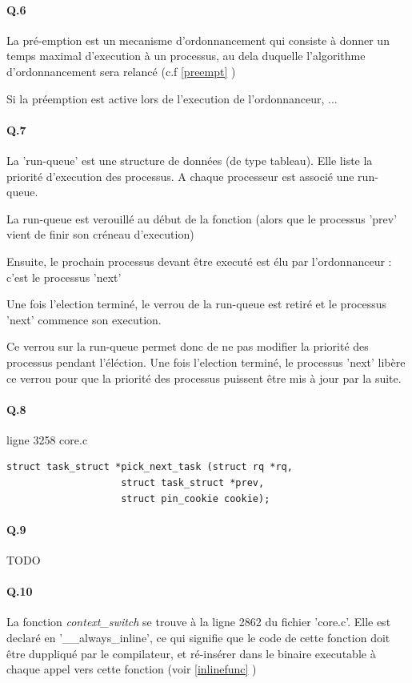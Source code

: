 \documentclass[10pt]{article}
\begin{document}
\paragraph{Q.6}
La pré-emption est un mecanisme d'ordonnancement qui consiste à donner un temps maximal d'execution à un processus,
au dela duquelle l'algorithme d'ordonnancement sera relancé (c.f \ref{preempt} )

Si la préemption est active lors de l'execution de l'ordonnanceur, ...
 
 \paragraph{Q.7}
 La 'run-queue' est une structure de données (de type tableau). Elle liste la priorité d'execution des processus.
 A chaque processeur est associé une run-queue.
 
 La run-queue est verouillé au début de la fonction  (alors que le processus 'prev' vient de finir son créneau d'execution)
 
 Ensuite, le prochain processus devant être executé est élu par l'ordonnanceur : c'est le processus 'next'
 
 Une fois l'election terminé, le verrou de la run-queue est retiré et le processus 'next' commence son execution.
 
 Ce verrou sur la run-queue permet donc de ne pas modifier la priorité des processus pendant l'éléction.
 Une fois l'election terminé, le processus 'next' libère ce verrou pour que la priorité des processus puissent être mis à jour par la suite.
 
\paragraph{Q.8} ligne 3258 core.c
\lstset{language=C}
\begin{lstlisting}[frame=single]
struct task_struct *pick_next_task (struct rq *rq,
				    struct task_struct *prev,
				    struct pin_cookie cookie);
\end{lstlisting}

 \paragraph{Q.9} TODO
 
 \paragraph{Q.10}
 La fonction \textit{context_switch} se trouve à la ligne 2862 du fichier 'core.c'.
 Elle est declaré en '__always_inline', ce qui signifie que le code de cette fonction doit être duppliqué par le compilateur,
 et ré-insérer dans le binaire executable à chaque appel vers cette fonction (voir \ref{inlinefunc} )
 
\end{document}
